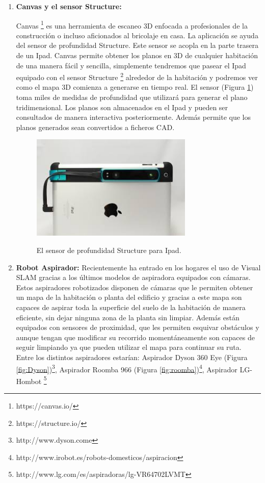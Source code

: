 \begin {enumerate}


\item \textbf{Canvas y el sensor Structure:}

Canvas \footnote{https://canvas.io/ } es una herramienta de escaneo 3D enfocada a profesionales de la construcción o incluso aficionados al bricolaje en casa. La aplicación se ayuda del sensor de profundidad Structure. Este sensor se acopla en la parte trasera de un Ipad. Canvas permite obtener los planos en 3D de cualquier habitación de una manera fácil y sencilla, simplemente tendremos que pasear el Ipad equipado con el sensor Structure \footnote{https://structure.io/} alrededor de la habitación y podremos ver como el mapa 3D comienza a generarse en tiempo real. El sensor (Figura \ref{fig:Structure}) toma miles de medidas de profundidad que utilizará para generar el plano tridimensional. Los planos son almacenados en el Ipad y pueden ser consultados de manera interactiva posteriormente. Además permite que los planos generados sean convertidos a ficheros CAD.

\begin{figure}[htbp]
\begin{center}
\label{fig:Structure}\includegraphics[height=5.0cm]{img/cap2/structureSensorCanvas.jpg}
\end{center}
\caption{El sensor de profundidad Structure para Ipad. }
\end{figure}




\item \textbf{Robot Aspirador:}
Recientemente ha entrado en los hogares el uso de Visual SLAM gracias a los últimos modelos de aspiradora equipados con cámaras.
Estos aspiradores robotizados disponen de cámaras que le permiten obtener un mapa de la habitación o planta del edificio y gracias a este mapa son capaces de aspirar toda la superficie del suelo de la habitación de manera eficiente, sin dejar ninguna zona de la planta sin limpiar. Además están equipados con sensores de proximidad, que les permiten esquivar obstáculos y aunque tengan que modificar su recorrido momentáneamente son capaces de seguir limpiando ya que pueden utilizar el mapa para continuar su ruta. Entre los distintos aspiradores estarían:
Aspirador Dyson 360 Eye (Figura \ref{fig:Dyson})\footnote{http://www.dyson.come}, Aspirador Roomba 966 (Figura \ref{fig:roomba})\footnote{http://www.irobot.es/robots-domesticos/aspiracion}, Aspirador LG-Hombot \footnote{http://www.lg.com/es/aspiradoras/lg-VR64702LVMT}


\end{enumerate}
